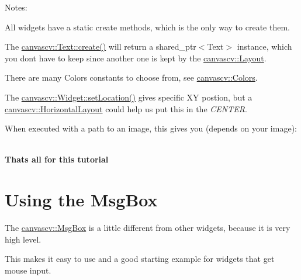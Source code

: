 Notes\+:
\begin{DoxyItemize}
\item All widgets have a static create methods, which is the only way to create them.
\item The \hyperlink{classcanvascv_1_1Text_a7f3552263b6f185f78d90549e7ac38f7}{canvascv\+::\+Text\+::create()} will return a shared\+\_\+ptr$<$\+Text$>$ instance, which you don\textquotesingle{}t have to keep since another one is kept by the \hyperlink{classcanvascv_1_1Layout}{canvascv\+::\+Layout}.
\item There are many Colors constants to choose from, see \hyperlink{classcanvascv_1_1Colors}{canvascv\+::\+Colors}.
\item The \hyperlink{classcanvascv_1_1Widget_a8a36b15a1c777baffbb4fcd4ccda3c45}{canvascv\+::\+Widget\+::set\+Location()} gives specific XY postion, but a \hyperlink{classcanvascv_1_1HorizontalLayout}{canvascv\+::\+Horizontal\+Layout} could help us put this in the {\itshape C\+E\+N\+T\+ER}.
\item When executed with a path to an image, this gives you (depends on your image)\+:  ~\newline

\end{DoxyItemize}

{\bfseries That\textquotesingle{}s all for this tutorial} \hypertarget{tutmsgbox}{}\section{Using the Msg\+Box}\label{tutmsgbox}
The \hyperlink{classcanvascv_1_1MsgBox}{canvascv\+::\+Msg\+Box} is a little different from other widgets, because it is very high level.

This makes it easy to use and a good starting example for widgets that get mouse input.

